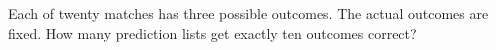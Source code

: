 Each of twenty matches has three possible outcomes. The actual outcomes are fixed. How many prediction lists get exactly ten outcomes correct?
